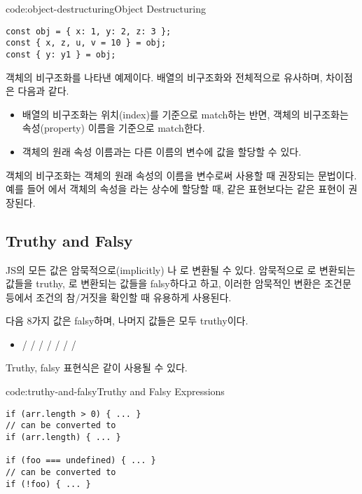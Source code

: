 \begin{codeenv}{code:object-destructuring}{Object Destructuring}\begin{verbatim}
const obj = { x: 1, y: 2, z: 3 };
const { x, z, u, v = 10 } = obj;
const { y: y1 } = obj;
\end{verbatim}
\end{codeenv}

\은 객체의 비구조화를 나타낸 예제이다. 배열의 비구조화와 전체적으로 유사하며, 차이점은 다음과 같다.

\begin{itemize}
    \item 배열의 비구조화는 위치(index)를 기준으로 match하는 반면, 객체의 비구조화는 속성(property) 이름을 기준으로 match한다.
    \item 객체의 원래 속성 이름과는 다른 이름의 변수에 값을 할당할 수 있다.
\end{itemize}

객체의 비구조화는 객체의 원래 속성의 이름을 변수로써 사용할 때 권장되는 문법이다. 예를 들어 에서  객체의  속성을 라는 상수에 할당할 때,  같은 표현보다는  같은 표현이 권장된다.
\clearpage

\subsection*{Truthy and Falsy}

JS의 모든 값은 암묵적으로(implicitly) 나 로 변환될 수 있다. 암묵적으로 로 변환되는 값들을 truthy, 로 변환되는 값들을 falsy하다고 하고, 이러한 암묵적인 변환은 조건문 등에서 조건의 참/거짓을 확인할 때 유용하게 사용된다.

다음 8가지 값은 falsy하며, 나머지 값들은 모두 truthy이다.

\begin{itemize}
    \item {} /  /  /  /  /  /  / 
\end{itemize}

Truthy, falsy 표현식은 \와 같이 사용될 수 있다.

\begin{codeenv}{code:truthy-and-falsy}{Truthy and Falsy Expressions}\begin{verbatim}
if (arr.length > 0) { ... }
// can be converted to
if (arr.length) { ... }

if (foo === undefined) { ... }
// can be converted to
if (!foo) { ... }
\end{verbatim}
\end{codeenv}

